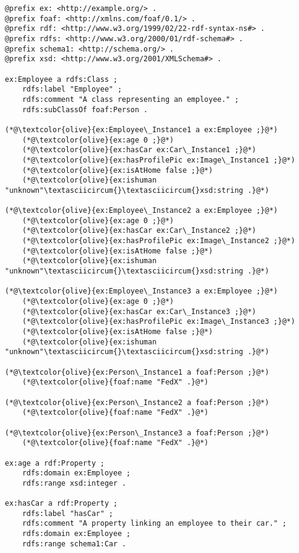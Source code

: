     \begin{lstlisting}[caption={Result Test Case 1.2}, label={lst:three-rdf-instances-extended}]
@prefix ex: <http://example.org/> .
@prefix foaf: <http://xmlns.com/foaf/0.1/> .
@prefix rdf: <http://www.w3.org/1999/02/22-rdf-syntax-ns#> .
@prefix rdfs: <http://www.w3.org/2000/01/rdf-schema#> .
@prefix schema1: <http://schema.org/> .
@prefix xsd: <http://www.w3.org/2001/XMLSchema#> .

ex:Employee a rdfs:Class ;
    rdfs:label "Employee" ;
    rdfs:comment "A class representing an employee." ;
    rdfs:subClassOf foaf:Person .

(*@\textcolor{olive}{ex:Employee\_Instance1 a ex:Employee ;}@*)
    (*@\textcolor{olive}{ex:age 0 ;}@*)
    (*@\textcolor{olive}{ex:hasCar ex:Car\_Instance1 ;}@*)
    (*@\textcolor{olive}{ex:hasProfilePic ex:Image\_Instance1 ;}@*)
    (*@\textcolor{olive}{ex:isAtHome false ;}@*)
    (*@\textcolor{olive}{ex:ishuman "unknown"\textasciicircum{}\textasciicircum{}xsd:string .}@*)

(*@\textcolor{olive}{ex:Employee\_Instance2 a ex:Employee ;}@*)
    (*@\textcolor{olive}{ex:age 0 ;}@*)
    (*@\textcolor{olive}{ex:hasCar ex:Car\_Instance2 ;}@*)
    (*@\textcolor{olive}{ex:hasProfilePic ex:Image\_Instance2 ;}@*)
    (*@\textcolor{olive}{ex:isAtHome false ;}@*)
    (*@\textcolor{olive}{ex:ishuman "unknown"\textasciicircum{}\textasciicircum{}xsd:string .}@*)

(*@\textcolor{olive}{ex:Employee\_Instance3 a ex:Employee ;}@*)
    (*@\textcolor{olive}{ex:age 0 ;}@*)
    (*@\textcolor{olive}{ex:hasCar ex:Car\_Instance3 ;}@*)
    (*@\textcolor{olive}{ex:hasProfilePic ex:Image\_Instance3 ;}@*)
    (*@\textcolor{olive}{ex:isAtHome false ;}@*)
    (*@\textcolor{olive}{ex:ishuman "unknown"\textasciicircum{}\textasciicircum{}xsd:string .}@*)

(*@\textcolor{olive}{ex:Person\_Instance1 a foaf:Person ;}@*)
    (*@\textcolor{olive}{foaf:name "FedX" .}@*)

(*@\textcolor{olive}{ex:Person\_Instance2 a foaf:Person ;}@*)
    (*@\textcolor{olive}{foaf:name "FedX" .}@*)

(*@\textcolor{olive}{ex:Person\_Instance3 a foaf:Person ;}@*)
    (*@\textcolor{olive}{foaf:name "FedX" .}@*)

ex:age a rdf:Property ;
    rdfs:domain ex:Employee ;
    rdfs:range xsd:integer .

ex:hasCar a rdf:Property ;
    rdfs:label "hasCar" ;
    rdfs:comment "A property linking an employee to their car." ;
    rdfs:domain ex:Employee ;
    rdfs:range schema1:Car .


\end{lstlisting}
